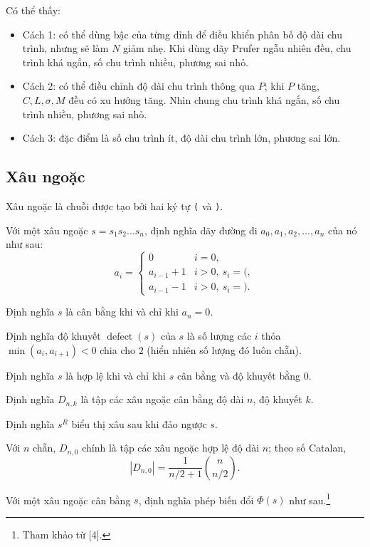 \documentclass[11pt]{article}
\begin{document}
Có thể thấy:

\begin{itemize}
  \item Cách 1: có thể dùng bậc của từng đỉnh để điều khiển phân bố độ dài chu
  trình, nhưng sẽ làm $N$ giảm nhẹ. Khi dùng dãy Prufer ngẫu nhiên đều, chu
  trình khá ngắn, số chu trình nhiều, phương sai nhỏ.
  \item Cách 2: có thể điều chỉnh độ dài chu trình thông qua $P$; khi $P$ tăng,
  $C,L,\sigma,M$ đều có xu hướng tăng. Nhìn chung chu trình khá ngắn, số chu
  trình nhiều, phương sai nhỏ.
  \item Cách 3: đặc điểm là số chu trình ít, độ dài chu trình lớn, phương sai
  lớn.
\end{itemize}

\subsection{Xâu ngoặc}

Xâu ngoặc là chuỗi được tạo bởi hai ký tự \texttt{(} và \texttt{)}.

Với một xâu ngoặc $s=s_1s_2\ldots s_n$, định nghĩa dãy đường đi
$a_0,a_1,a_2,\ldots,a_n$ của nó như sau:
\[
a_i=
\begin{cases}
0 & i=0,\\
a_{i-1}+1 & i>0,\ s_i=\texttt{(},\\
a_{i-1}-1 & i>0,\ s_i=\texttt{)}.
\end{cases}
\]

Định nghĩa $s$ là cân bằng khi và chỉ khi $a_n=0$.

Định nghĩa độ khuyết $\operatorname{defect}(s)$ của $s$ là số lượng các $i$
thỏa $\min(a_i,a_{i+1})<0$ chia cho $2$ (hiển nhiên số lượng đó luôn chẵn).

Định nghĩa $s$ là hợp lệ khi và chỉ khi $s$ cân bằng và độ khuyết bằng $0$.

Định nghĩa $D_{n,k}$ là tập các xâu ngoặc cân bằng độ dài $n$, độ khuyết $k$.

Định nghĩa $s^R$ biểu thị xâu sau khi đảo ngược $s$.

Với $n$ chẵn, $D_{n,0}$ chính là tập các xâu ngoặc hợp lệ độ dài $n$; theo số
Catalan,
\[
|D_{n,0}|=\frac{1}{n/2+1}\binom{n}{n/2}.
\]

Với một xâu ngoặc cân bằng $s$, định nghĩa phép biến đổi $\Phi(s)$ như
sau.\footnote{Tham khảo từ [4].}
\end{document}
